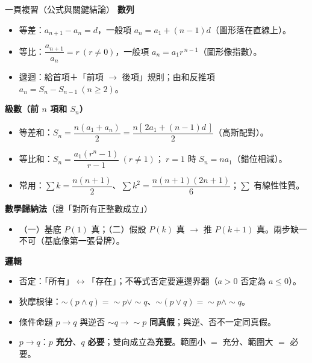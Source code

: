 \documentclass[11pt]{article}
\begin{document}
\begin{補充框}{一頁複習（公式與關鍵結論）}
\textbf{數列}
\begin{itemize}\setlength{\itemsep}{1pt}
\item 等差：$a_{n+1}-a_n=d$，一般項 $a_n=a_1+(n-1)d$（圖形落在直線上）。
\item 等比：$\dfrac{a_{n+1}}{a_n}=r\ (r\neq0)$，一般項 $a_n=a_1r^{\,n-1}$（圖形像指數）。
\item 遞迴：給首項＋「前項 $\to$ 後項」規則；由和反推項 $a_n=S_n-S_{n-1}\ (n\ge2)$。
\end{itemize}

\textbf{級數（前 $n$ 項和 $S_n$）}
\begin{itemize}\setlength{\itemsep}{1pt}
\item 等差和：$S_n=\dfrac{n(a_1+a_n)}{2}=\dfrac{n[\,2a_1+(n-1)d\,]}{2}$（高斯配對）。
\item 等比和：$S_n=\dfrac{a_1(r^{n}-1)}{r-1}\ (r\neq1)$；$\ r=1$ 時 $S_n=na_1$（錯位相減）。
\item 常用：$\displaystyle\sum k=\dfrac{n(n+1)}{2}$、$\displaystyle\sum k^2=\dfrac{n(n+1)(2n+1)}{6}$；$\sum$ 有線性性質。
\end{itemize}

\textbf{數學歸納法}（證「對所有正整數成立」）
\begin{itemize}\setlength{\itemsep}{1pt}
\item （一）基底 $P(1)$ 真；（二）假設 $P(k)$ 真 $\to$ 推 $P(k+1)$ 真。兩步缺一不可（基底像第一張骨牌）。
\end{itemize}

\textbf{邏輯}
\begin{itemize}\setlength{\itemsep}{1pt}
\item 否定：「所有」$\leftrightarrow$「存在」；不等式否定要連邊界翻（$a>0$ 否定為 $a\le0$）。
\item 狄摩根律：$\sim(p\wedge q)=\sim p\vee\sim q$、$\sim(p\vee q)=\sim p\wedge\sim q$。
\item 條件命題 $p\to q$ 與逆否 $\sim q\to\sim p$ \textbf{同真假}；與逆、否不一定同真假。
\item $p\to q$：$p$ \textbf{充分}、$q$ \textbf{必要}；雙向成立為\textbf{充要}。範圍小 $=$ 充分、範圍大 $=$ 必要。
\end{itemize}
\end{補充框}
\end{document}
